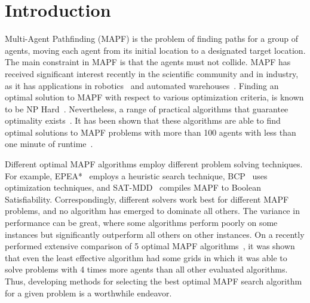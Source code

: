 \documentclass{ecai}
\newcommand{\shortcite}[1]{\cite{#1}}
\begin{document}
\section{Introduction}
\label{scn:Intro}

Multi-Agent Pathfinding (MAPF) is the problem of finding paths for a group of agents, moving each agent from its initial location to a designated target location. 
The main constraint in MAPF is that the agents must not collide. 
MAPF has received significant interest recently in the scientific community and in industry, as it has applications in robotics~\cite{veloso2015cobots} and automated warehouses~\cite{wurman2008coordinating}. 
Finding an optimal solution to MAPF with respect to various optimization criteria, is known to be NP Hard~\cite{anOptimization2010surynek,structure2013yu}. 
Nevertheless, a range of practical algorithms that guarantee optimality exists~\cite{kornhauser1984pebble,surynek2009novel}. 
It has been shown that these algorithms are able to find optimal solutions to MAPF problems with more than 100 agents with less than one minute of runtime~\cite{li2021pairwise}. 

Different optimal MAPF algorithms employ different problem solving techniques. For example, EPEA*~\cite{goldenberg2014enhanced} employs a heuristic search technique, BCP~\cite{lam2022branch} uses optimization techniques, and SAT-MDD~\cite{surynek2016efficient} compiles MAPF to Boolean Satisfiability. 
Correspondingly, different solvers work best for different MAPF problems, and no algorithm has emerged to dominate all others. 
The variance in performance can be great, where some algorithms perform poorly on some instances but significantly outperform all others on other instances. 
On a recently performed extensive comparison of 5 optimal MAPF algorithms~\cite{kaduri2021experimental}, it was shown that even the least effective algorithm had some grids in which it was able to solve problems with 4 times more agents than all other evaluated algorithms. %
Thus, developing methods for selecting the best optimal MAPF search algorithm for a given problem is a worthwhile endeavor. %


\end{document}
